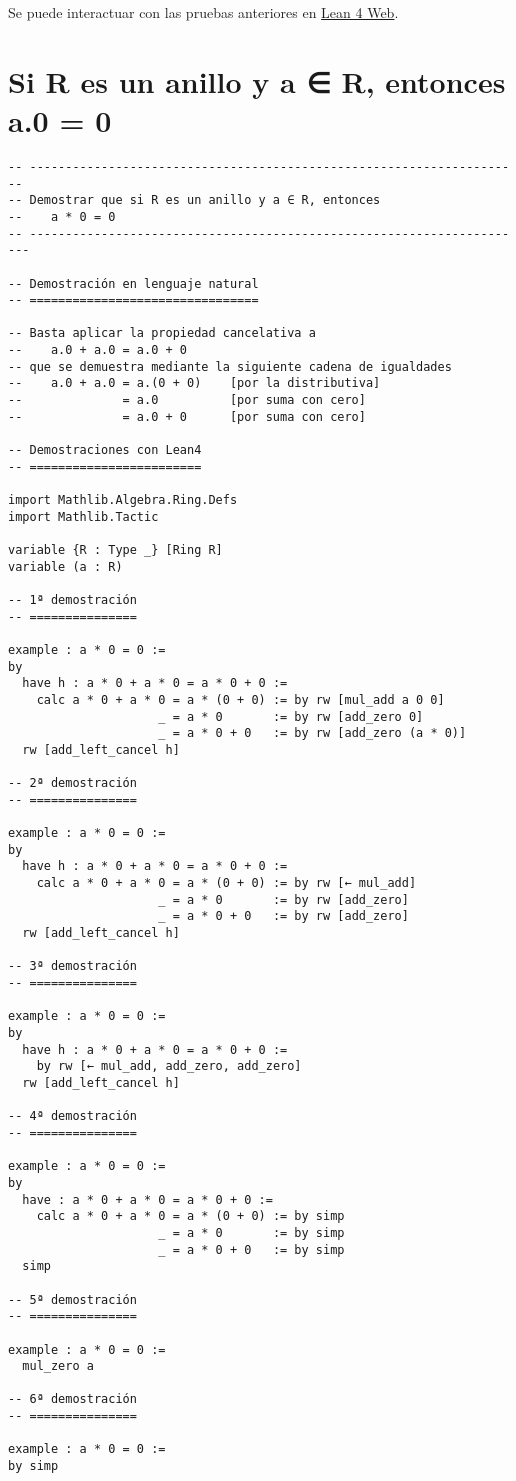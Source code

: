 Se puede interactuar con las pruebas anteriores en \href{https://lean.math.hhu.de/\#url=https://raw.githubusercontent.com/jaalonso/Calculemus2/main/src/Cancelativa\_derecha.lean}{Lean 4 Web}.

\section{Si R es un anillo y a ∈ R, entonces a.0 = 0}
\label{sec:org7b9fdb6}
\begin{verbatim}
-- ---------------------------------------------------------------------
-- Demostrar que si R es un anillo y a ∈ R, entonces
--    a * 0 = 0
-- ----------------------------------------------------------------------

-- Demostración en lenguaje natural
-- ================================

-- Basta aplicar la propiedad cancelativa a
--    a.0 + a.0 = a.0 + 0
-- que se demuestra mediante la siguiente cadena de igualdades
--    a.0 + a.0 = a.(0 + 0)    [por la distributiva]
--              = a.0          [por suma con cero]
--              = a.0 + 0      [por suma con cero]

-- Demostraciones con Lean4
-- ========================

import Mathlib.Algebra.Ring.Defs
import Mathlib.Tactic

variable {R : Type _} [Ring R]
variable (a : R)

-- 1ª demostración
-- ===============

example : a * 0 = 0 :=
by
  have h : a * 0 + a * 0 = a * 0 + 0 :=
    calc a * 0 + a * 0 = a * (0 + 0) := by rw [mul_add a 0 0]
                     _ = a * 0       := by rw [add_zero 0]
                     _ = a * 0 + 0   := by rw [add_zero (a * 0)]
  rw [add_left_cancel h]

-- 2ª demostración
-- ===============

example : a * 0 = 0 :=
by
  have h : a * 0 + a * 0 = a * 0 + 0 :=
    calc a * 0 + a * 0 = a * (0 + 0) := by rw [← mul_add]
                     _ = a * 0       := by rw [add_zero]
                     _ = a * 0 + 0   := by rw [add_zero]
  rw [add_left_cancel h]

-- 3ª demostración
-- ===============

example : a * 0 = 0 :=
by
  have h : a * 0 + a * 0 = a * 0 + 0 :=
    by rw [← mul_add, add_zero, add_zero]
  rw [add_left_cancel h]

-- 4ª demostración
-- ===============

example : a * 0 = 0 :=
by
  have : a * 0 + a * 0 = a * 0 + 0 :=
    calc a * 0 + a * 0 = a * (0 + 0) := by simp
                     _ = a * 0       := by simp
                     _ = a * 0 + 0   := by simp
  simp

-- 5ª demostración
-- ===============

example : a * 0 = 0 :=
  mul_zero a

-- 6ª demostración
-- ===============

example : a * 0 = 0 :=
by simp
\end{verbatim}
